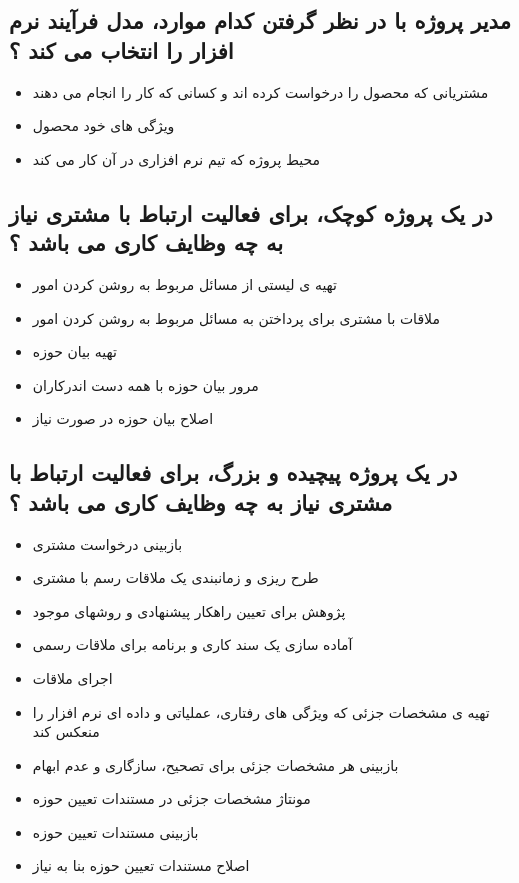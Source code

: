 \documentclass{article}
\begin{document}
\subsection{مدیر پروژه با در نظر گرفتن کدام موارد، مدل فرآیند نرم افزار را انتخاب می کند ؟}


\begin{itemize}
	\item مشتریانی که محصول را درخواست کرده اند و کسانی که کار را انجام می دهند 
	\item ویژگی های خود محصول
	\item محیط پروژه که تیم نرم افزاری در آن کار می کند
\end{itemize}





\subsection{در یک پروژه کوچک، برای فعالیت ارتباط با مشتری نیاز به چه وظایف کاری می باشد ؟}



\begin{itemize}
	\item تهیه ی لیستی از مسائل مربوط به روشن کردن امور
	\item ملاقات با مشتری برای پرداختن به مسائل مربوط به روشن کردن امور
	\item تهیه بیان حوزه
	\item مرور بیان حوزه با همه دست اندرکاران
	\item اصلاح بیان حوزه در صورت نیاز
\end{itemize}



\subsection{در یک پروژه پیچیده و بزرگ، برای فعالیت ارتباط با مشتری نیاز به چه وظایف کاری می باشد ؟}

\begin{itemize}
	\item بازبینی درخواست مشتری
	\item طرح ریزی و زمانبندی یک ملاقات رسم با مشتری
	\item پژوهش برای تعیین راهکار پیشنهادی و روشهای موجود
	\item آماده سازی یک سند کاری و برنامه برای ملاقات رسمی
	\item اجرای ملاقات
	\item تهیه ی مشخصات جزئی که ویژگی های رفتاری، عملیاتی و داده ای نرم افزار را منعکس کند
	\item بازبینی هر مشخصات جزئی برای تصحیح، سازگاری و عدم ابهام
	\item مونتاژ مشخصات جزئی در مستندات تعیین حوزه
	\item بازبینی مستندات تعیین حوزه
	\item اصلاح مستندات تعیین حوزه بنا به نیاز
\end{itemize}
\end{document}
